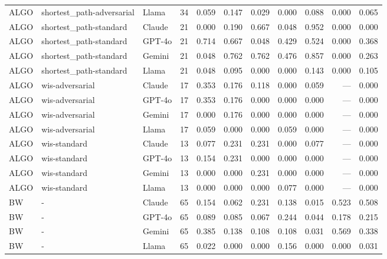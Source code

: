 \begin{table}[t]
\begin{tabular}{lllr*{7}{r}}
ALGO & shortest_path-adversarial & Llama & 34 & 0.059 & 0.147 & 0.029 & 0.000 & 0.088 & 0.000 & 0.065 \\
ALGO & shortest_path-standard & Claude & 21 & 0.000 & 0.190 & 0.667 & 0.048 & 0.952 & 0.000 & 0.000 \\
ALGO & shortest_path-standard & GPT-4o & 21 & 0.714 & 0.667 & 0.048 & 0.429 & 0.524 & 0.000 & 0.368 \\
ALGO & shortest_path-standard & Gemini & 21 & 0.048 & 0.762 & 0.762 & 0.476 & 0.857 & 0.000 & 0.263 \\
ALGO & shortest_path-standard & Llama & 21 & 0.048 & 0.095 & 0.000 & 0.000 & 0.143 & 0.000 & 0.105 \\
ALGO & wis-adversarial & Claude & 17 & 0.353 & 0.176 & 0.118 & 0.000 & 0.059 & --- & 0.000 \\
ALGO & wis-adversarial & GPT-4o & 17 & 0.353 & 0.176 & 0.000 & 0.000 & 0.000 & --- & 0.000 \\
ALGO & wis-adversarial & Gemini & 17 & 0.000 & 0.176 & 0.000 & 0.000 & 0.000 & --- & 0.000 \\
ALGO & wis-adversarial & Llama & 17 & 0.059 & 0.000 & 0.000 & 0.059 & 0.000 & --- & 0.000 \\
ALGO & wis-standard & Claude & 13 & 0.077 & 0.231 & 0.231 & 0.000 & 0.077 & --- & 0.000 \\
ALGO & wis-standard & GPT-4o & 13 & 0.154 & 0.231 & 0.000 & 0.000 & 0.000 & --- & 0.000 \\
ALGO & wis-standard & Gemini & 13 & 0.000 & 0.000 & 0.231 & 0.000 & 0.000 & --- & 0.000 \\
ALGO & wis-standard & Llama & 13 & 0.000 & 0.000 & 0.000 & 0.077 & 0.000 & --- & 0.000 \\
\midrule
BW & - & Claude & 65 & 0.154 & 0.062 & 0.231 & 0.138 & 0.015 & 0.523 & 0.508 \\
BW & - & GPT-4o & 65 & 0.089 & 0.085 & 0.067 & 0.244 & 0.044 & 0.178 & 0.215 \\
BW & - & Gemini & 65 & 0.385 & 0.138 & 0.108 & 0.108 & 0.031 & 0.569 & 0.338 \\
BW & - & Llama & 65 & 0.022 & 0.000 & 0.000 & 0.156 & 0.000 & 0.000 & 0.031 \\
\bottomrule
\end{tabular}
\end{table}